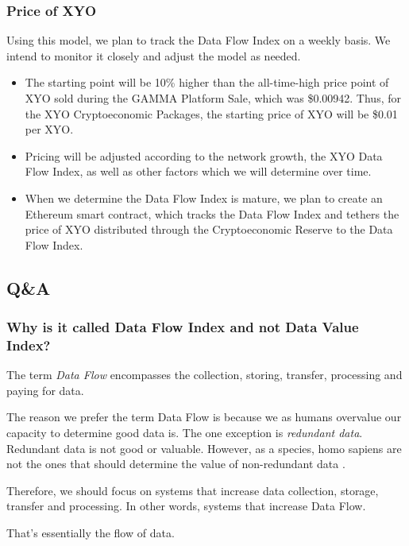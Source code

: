 \documentclass{article}
\begin{document}
\subsubsection{Price of XYO}

Using this model, we plan to track the Data Flow Index on a weekly basis. We intend to monitor it closely and adjust the model as needed.

\begin{itemize}
  \item The starting point will be 10\% higher than the all-time-high price point of XYO sold during the GAMMA Platform Sale, which was \$0.00942. Thus, for the XYO Cryptoeconomic Packages, the starting price of XYO will be \$0.01 per XYO.
  \item Pricing will be adjusted according to the network growth, the XYO Data Flow Index, as well as other factors which we will determine over time.
  \item When we determine the Data Flow Index is mature, we plan to create an Ethereum smart contract, which tracks the Data Flow Index and tethers the price of XYO distributed through the Cryptoeconomic Reserve to the Data Flow Index.
\end{itemize}

\subsection{Q\&A}

\subsubsection{Why is it called Data Flow Index and not Data Value Index?}

The term \textit{Data Flow} encompasses the collection, storing, transfer, processing and paying for data. 

The reason we prefer the term Data Flow is because we as humans overvalue our capacity to determine good data is. The one exception is \textit{redundant data}. Redundant data is not good or valuable. However, as a species, homo sapiens are not the ones that should determine the value of non-redundant data \cite{homo-deus-narrative}. 

Therefore, we should focus on systems that increase data collection, storage, transfer and processing. In other words, systems that increase Data Flow. 



That’s essentially the flow of data. 
\end{document}
